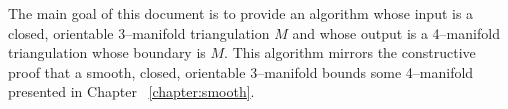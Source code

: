 \label{chapter:introduction}

%
%

The main goal of this document is to provide an algorithm whose input is a closed, orientable 3--manifold triangulation $M$ and whose output is a 4--manifold triangulation whose boundary is $M$.
This algorithm mirrors the constructive proof that a smooth, closed, orientable 3--manifold bounds some 4--manifold presented in Chapter ~\ref{chapter:smooth}.